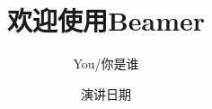 \documentclass{beamer}
\title{欢迎使用Beamer}
\author{You/你是谁}
\institute{Where You Are From/你出自哪里}
\date{演讲日期}
\begin{document}
\begin{CJK*}{UTF8}{gbsn}

\begin{frame}
\titlepage 
\end{frame}

\clearpage\end{CJK*}
\end{document}
